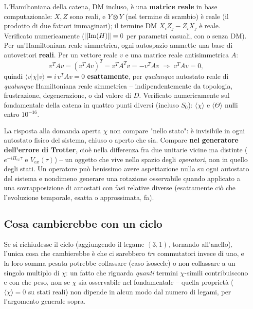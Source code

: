 \documentclass[11pt,a4paper]{article}
\begin{document}
L'Hamiltoniana della catena, DM incluso, è una \textbf{matrice reale} in
base computazionale: $X,Z$ sono reali, e $Y\otimes Y$ (nel termine di
scambio) è reale (il prodotto di due fattori immaginari); il termine DM
$X_iZ_j-Z_iX_j$ è reale. Verificato numericamente ($\|{\rm Im}(H)\|=0$ per
parametri casuali, con o senza DM). Per un'Hamiltoniana reale simmetrica,
ogni autospazio ammette una base di autovettori \textbf{reali}. Per un
vettore reale $v$ e una matrice reale antisimmetrica $A$:
\begin{equation}
v^TAv = (v^TAv)^T = v^TA^Tv = -v^TAv \;\Longrightarrow\; v^TAv=0,
\end{equation}
quindi $\langle v|\chi|v\rangle = i\,v^TAv = 0$ \textbf{esattamente}, per
\emph{qualunque} autostato reale di \emph{qualunque} Hamiltoniana reale
simmetrica -- indipendentemente da topologia, frustrazione, degenerazione,
o dal valore di $D$. Verificato numericamente sul fondamentale della
catena in quattro punti diversi (incluso $S_0$): $\langle\chi\rangle$ e
$\langle\Theta\rangle$ nulli entro $10^{-16}$.

\begin{okbox}{La risposta alla domanda aperta}
$\chi$ non compare "nello stato": è invisibile in ogni autostato fisico
del sistema, chiuso o aperto che sia. Compare \textbf{nel generatore
dell'errore di Trotter}, cioè nella differenza fra due unitarie vicine ma
distinte ($e^{-iH_{ex}\tau}$ e $V_{ex}(\tau)$) -- un oggetto che vive
nello spazio degli \emph{operatori}, non in quello degli stati. Un
operatore può benissimo avere aspettazione nulla su ogni autostato del
sistema e nondimeno generare una rotazione osservabile quando applicato a
una sovrapposizione di autostati con fasi relative diverse (esattamente
ciò che l'evoluzione temporale, esatta o approssimata, fa).
\end{okbox}

\subsection{Cosa cambierebbe con un ciclo}

Se si richiudesse il ciclo (aggiungendo il legame $(3,1)$, tornando
all'anello), l'unica cosa che cambierebbe è che ci sarebbero \emph{tre}
commutatori invece di uno, e la loro somma pesata potrebbe collassare
(caso isoscele) o non collassare a un singolo multiplo di $\chi$: un fatto
che riguarda \emph{quanti} termini $\chi$-simili contribuiscono e con che
peso, non se $\chi$ sia osservabile nel fondamentale -- quella proprietà
($\langle\chi\rangle=0$ su stati reali) non dipende in alcun modo dal
numero di legami, per l'argomento generale sopra.
\end{document}
